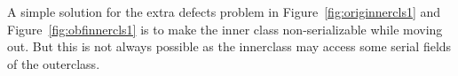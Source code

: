 \documentclass[conference]{IEEEtran}
\begin{document}
A simple solution for the extra defects problem in Figure~\ref{fig:originnercls1} and Figure~\ref{fig:obfinnercls1} is to make the inner class non-serializable
while moving out. But this is not always possible as the innerclass may access some serial fields of the outerclass. 
\begin{figure}[ht!]
\centering
{}
\end{figure}
\end{document}
